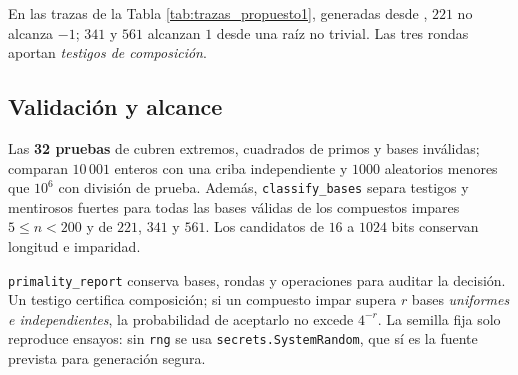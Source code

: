 

En las trazas de la Tabla \ref{tab:trazas_propuesto1}, generadas desde , $221$ no alcanza $-1$; $341$ y $561$ alcanzan $1$ desde una raíz no trivial. Las tres rondas aportan \emph{testigos de composición}.

\subsection{Validación y alcance}
Las \textbf{32 pruebas} de  cubren extremos, cuadrados de primos y bases inválidas; comparan $10\,001$ enteros con una criba independiente y $1000$ aleatorios menores que $10^6$ con división de prueba. Además, \texttt{classify\_bases} separa testigos y mentirosos fuertes para todas las bases válidas de los compuestos impares $5\le n<200$ y de $221$, $341$ y $561$. Los candidatos de $16$ a $1024$ bits conservan longitud e imparidad.

\texttt{primality\_report} conserva bases, rondas y operaciones para auditar la decisión. Un testigo certifica composición; si un compuesto impar supera $r$ bases \emph{uniformes e independientes}, la probabilidad de aceptarlo no excede $4^{-r}$. La semilla fija solo reproduce ensayos: sin \texttt{rng} se usa \texttt{secrets.SystemRandom}, que sí es la fuente prevista para generación segura.
